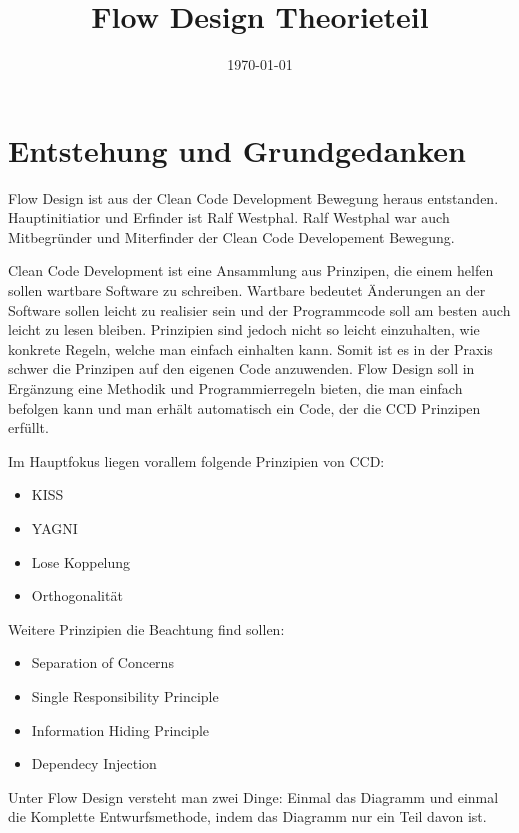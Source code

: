 \documentclass[11pt]{article}
\date{\today}
\title{Flow Design Theorieteil}
\begin{document}
\maketitle
\tableofcontents


\section{Entstehung und Grundgedanken}
\label{sec:orgheadline1}
Flow Design ist aus der Clean Code Development Bewegung heraus entstanden. Hauptinitiatior und Erfinder ist Ralf Westphal.
Ralf Westphal war auch Mitbegründer und Miterfinder der Clean Code Developement Bewegung.


Clean Code Development ist eine Ansammlung aus Prinzipen, die einem helfen sollen wartbare Software zu schreiben.
Wartbare bedeutet Änderungen an der Software sollen leicht zu realisier sein und der Programmcode soll
am besten auch leicht zu lesen bleiben.
Prinzipien sind jedoch nicht so leicht einzuhalten, wie konkrete Regeln, welche man einfach einhalten kann.
Somit ist es in der Praxis schwer die Prinzipen auf den eigenen Code anzuwenden.
Flow Design soll in Ergänzung eine Methodik und Programmierregeln bieten, die man einfach befolgen kann und man erhält automatisch
ein Code, der die CCD Prinzipen erfüllt.

Im Hauptfokus liegen vorallem folgende Prinzipien von CCD:
\begin{itemize}
\item KISS
\item YAGNI
\item Lose Koppelung
\item Orthogonalität
\end{itemize}

Weitere Prinzipien die Beachtung find sollen:
\begin{itemize}
\item Separation of Concerns
\item Single Responsibility Principle
\item Information Hiding Principle
\item Dependecy Injection
\end{itemize}

Unter Flow Design versteht man zwei Dinge:
Einmal das Diagramm und einmal die Komplette Entwurfsmethode, indem das
Diagramm nur ein Teil davon ist.
\end{document}
